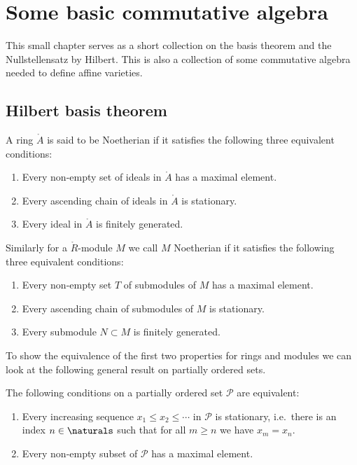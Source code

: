 \chapter{Some basic commutative algebra}

This small chapter serves as a short collection on the basis theorem
and the Nullstellensatz by Hilbert. This is also a collection of some
commutative algebra needed to define affine varieties.


\section{Hilbert basis theorem}

\begin{definition}
  \label{def:noetherian-ring-noetherian-module}
  A ring $\ring{A}$ is said to be Noetherian if it satisfies the
  following three equivalent conditions:
  \begin{enumerate}[label=(\roman*)]
  \item Every non-empty set of ideals in $\ring{A}$ has a maximal
    element.
  \item Every ascending chain of ideals in $\ring{A}$ is stationary.
  \item Every ideal in $\ring{A}$ is finitely generated.
  \end{enumerate}
  Similarly for a $\ring{R}$-module $M$ we call $M$ Noetherian if it
  satisfies the following three equivalent conditions:
  \begin{enumerate}[label=(\roman*)]
  \item Every non-empty set $T$ of submodules of $M$ has a maximal
    element.
  \item Every ascending chain of submodules of $M$ is stationary.
  \item Every submodule $N\subset M$ is finitely generated.
  \end{enumerate}
\end{definition}

To show the equivalence of the first two properties for rings and
modules we can look at the following general result on partially
ordered sets.

\begin{proposition}
  \label{prop:equivalence-noetherian-conditions-rings}
  The following conditions on a partially ordered set $\mathcal{P}$
  are equivalent:
  \begin{enumerate}[label=(\roman*)]
  \item\label{item:inc-secquence} Every increasing sequence $x_1 \leq x_2 \leq \cdots$ in
    $\mathcal{P}$ is stationary, i.e.\ there is an index $n\in
    \naturals$ such that for all $m\geq n$ we have $x_m = x_n$.
  \item\label{item:max-element} Every non-empty subset of
    $\mathcal{P}$ has a maximal element.
  \end{enumerate}
\end{proposition}


